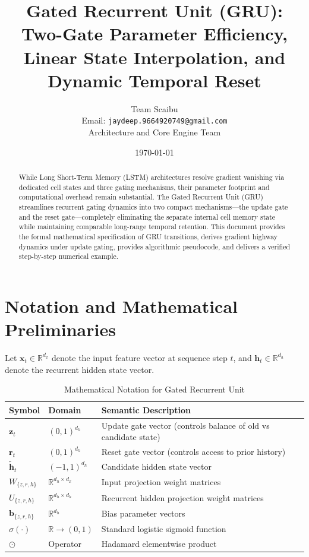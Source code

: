 \documentclass[11pt,a4paper]{article}
\title{Gated Recurrent Unit (GRU): Two-Gate Parameter Efficiency, Linear State Interpolation, and Dynamic Temporal Reset}
\author{Team Scaibu \\ \small Email: \texttt{jaydeep.9664920749@gmail.com} \\ \small Architecture and Core Engine Team}
\date{\today}
\theoremstyle{definition}
\begin{document}
\maketitle

\begin{abstract}
While Long Short-Term Memory (LSTM) architectures resolve gradient vanishing via dedicated cell states and three gating mechanisms, their parameter footprint and computational overhead remain substantial. The Gated Recurrent Unit (GRU) streamlines recurrent gating dynamics into two compact mechanisms—the update gate and the reset gate—completely eliminating the separate internal cell memory state while maintaining comparable long-range temporal retention. This document provides the formal mathematical specification of GRU transitions, derives gradient highway dynamics under update gating, provides algorithmic pseudocode, and delivers a verified step-by-step numerical example.
\end{abstract}

\section{Notation and Mathematical Preliminaries}

Let $\mathbf{x}_t \in \mathbb{R}^{d_x}$ denote the input feature vector at sequence step $t$, and $\mathbf{h}_t \in \mathbb{R}^{d_h}$ denote the recurrent hidden state vector.

\begin{table}[h]
\centering
\caption{Mathematical Notation for Gated Recurrent Unit}
\begin{tabular}{lll}
\toprule
\textbf{Symbol} & \textbf{Domain} & \textbf{Semantic Description} \\
\midrule
$\mathbf{z}_t$ & $(0, 1)^{d_h}$ & Update gate vector (controls balance of old vs candidate state) \\
$\mathbf{r}_t$ & $(0, 1)^{d_h}$ & Reset gate vector (controls access to prior history) \\
$\tilde{\mathbf{h}}_t$ & $(-1, 1)^{d_h}$ & Candidate hidden state vector \\
$W_{\{z,r,h\}}$ & $\mathbb{R}^{d_h \times d_x}$ & Input projection weight matrices \\
$U_{\{z,r,h\}}$ & $\mathbb{R}^{d_h \times d_h}$ & Recurrent hidden projection weight matrices \\
$\mathbf{b}_{\{z,r,h\}}$ & $\mathbb{R}^{d_h}$ & Bias parameter vectors \\
$\sigma(\cdot)$ & $\mathbb{R} \to (0, 1)$ & Standard logistic sigmoid function \\
$\odot$ & Operator & Hadamard elementwise product \\
\bottomrule
\end{tabular}
\end{table}
\end{document}
